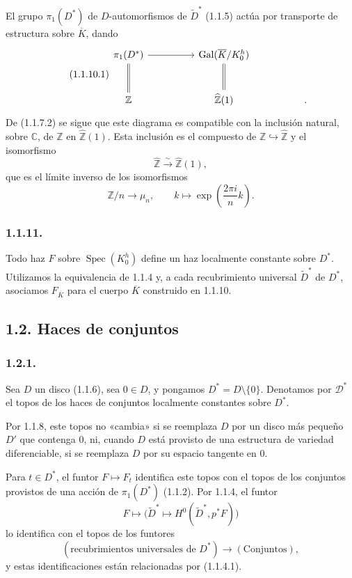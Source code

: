 El grupo $\pi_1(D^*)$ de $D$-automorfismos de $\widetilde D^*$ (1.1.5)
actúa por transporte de estructura sobre $\overline K$, dando
\begin{equation}\tag{1.1.10.1}
\begin{tikzcd}[column sep=huge, row sep=large]
\pi_1(D^*) \arrow[r] \arrow[d, equal]
  & \operatorname{Gal}(\overline K/K_0^h) \arrow[d, equal]
  & {} \\
\mathbb Z
  & \widehat{\mathbb Z}(1)
  & .
\end{tikzcd}
\end{equation}
De (1.1.7.2) se sigue que este diagrama es compatible con la inclusión natural,
sobre $\mathbb C$, de $\mathbb Z$ en $\widehat{\mathbb Z}(1)$. Esta inclusión
es el compuesto de $\mathbb Z\hookrightarrow\widehat{\mathbb Z}$ y el
isomorfismo
\[
\widehat{\mathbb Z}\xrightarrow{\ \sim\ }
\widehat{\mathbb Z}(1),
\]
que es el límite inverso de los isomorfismos
\[
\mathbb Z/n\longrightarrow\mu_n,
\qquad
k\longmapsto\exp\left(\frac{2\pi i}{n}k\right).
\]

\subsubsection*{1.1.11.}
Todo haz $F$ sobre $\operatorname{Spec}(K_0^h)$ define un haz localmente
constante sobre $D^*$. Utilizamos la equivalencia de 1.1.4 y, a cada
recubrimiento universal $\widetilde D^*$ de $D^*$, asociamos
$F_{\overline K}$ para el cuerpo $\overline K$ construido en 1.1.10.

\subsection*{1.2. Haces de conjuntos}

\subsubsection*{1.2.1.}
Sea $D$ un disco (1.1.6), sea $0\in D$, y pongamos
$D^*=D\setminus\{0\}$. Denotamos por $\mathcal D^*$ el topos de los haces de
conjuntos localmente constantes sobre $D^*$.

\pageoriginale

Por 1.1.8, este topos no «cambia» si se reemplaza $D$ por un disco más pequeño
$D'$ que contenga $0$, ni, cuando $D$ está provisto de una estructura de
variedad diferenciable, si se reemplaza $D$ por su espacio tangente en $0$.

Para $t\in D^*$, el funtor $F\longmapsto F_t$ identifica este topos con el
topos de los conjuntos provistos de una acción de $\pi_1(D^*)$ (1.1.2). Por
1.1.4, el funtor
\[
F\longmapsto
\bigl(\widetilde D^*\longmapsto
H^0(\widetilde D^*,p^*F)\bigr)
\]
lo identifica con el topos de los funtores
\[
(\text{recubrimientos universales de }D^*)
\longrightarrow(\text{Conjuntos}),
\]
y estas identificaciones están relacionadas por (1.1.4.1).


